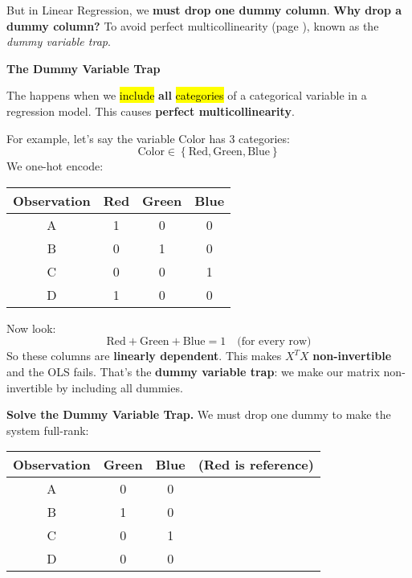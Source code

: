 \noindent
But in Linear Regression, we \textbf{must drop one dummy column}. \textcolor{Green3}{ \textbf{Why drop a dummy column?}} To avoid perfect multicollinearity (page \pageref{def: perfect collinearity}), known as the \emph{dummy variable trap}.

\highspace
\begin{flushleft}
    \textcolor{Red2}{ \textbf{The Dummy Variable Trap}}
\end{flushleft}
The  happens when we \hl{include} \textbf{all} \hl{categories} of a categorical variable in a regression model. This causes \textbf{perfect multicollinearity}.

\highspace
For example, let's say the variable Color has 3 categories:
\begin{equation*}
    \text{Color} \in \left\{\text{Red}, \text{Green}, \text{Blue}\right\}
\end{equation*}
We one-hot encode:
\begin{table}[!htp]
    \centering
    \begin{tabular}{@{} c c c c @{}}
        \toprule
        Observation & Red & Green & Blue \\
        \midrule
        A   & 1 & 0 & 0 \\ [.3em]
        B   & 0 & 1 & 0 \\ [.3em]
        C   & 0 & 0 & 1 \\ [.3em]
        D   & 1 & 0 & 0 \\
        \bottomrule
    \end{tabular}
\end{table}

\noindent
Now look:
\begin{equation*}
    \text{Red} + \text{Green} + \text{Blue} = 1 \quad \text{(for every row)}
\end{equation*}
So these columns are \textbf{linearly dependent}. This makes $X^{T}X$ \textbf{non-invertible} and the OLS fails. That's the \textbf{dummy variable trap}: we make our matrix non-invertible by including all dummies.

\highspace
\textcolor{Green3}{ \textbf{Solve the Dummy Variable Trap.}} We must drop one dummy to make the system full-rank:
\begin{table}[!htp]
    \centering
    \begin{tabular}{@{} c c c c @{}}
        \toprule
        Observation & Green & Blue & (Red is reference) \\
        \midrule
        A   & 0 & 0 & \\ [.3em]
        B   & 1 & 0 & \\ [.3em]
        C   & 0 & 1 & \\ [.3em]
        D   & 0 & 0 & \\
        \bottomrule
    \end{tabular}
\end{table}

